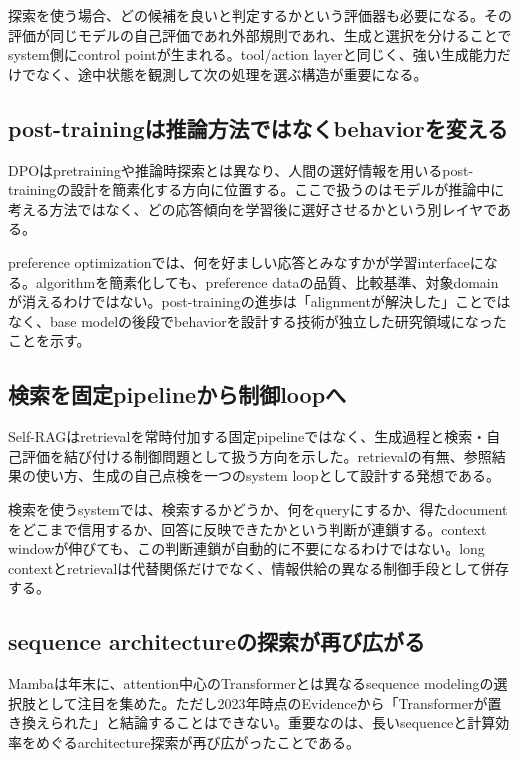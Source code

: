 探索を使う場合、どの候補を良いと判定するかという評価器も必要になる。その評価が同じモデルの自己評価であれ外部規則であれ、生成と選択を分けることでsystem側にcontrol pointが生まれる。tool/action layerと同じく、強い生成能力だけでなく、途中状態を観測して次の処理を選ぶ構造が重要になる。\autocite{src-8a38211129c4}


\subsection{post-trainingは推論方法ではなくbehaviorを変える}

DPOはpretrainingや推論時探索とは異なり、人間の選好情報を用いるpost-trainingの設計を簡素化する方向に位置する。ここで扱うのはモデルが推論中に考える方法ではなく、どの応答傾向を学習後に選好させるかという別レイヤである。\autocite{src-21aef0026892}


preference optimizationでは、何を好ましい応答とみなすかが学習interfaceになる。algorithmを簡素化しても、preference dataの品質、比較基準、対象domainが消えるわけではない。post-trainingの進歩は「alignmentが解決した」ことではなく、base modelの後段でbehaviorを設計する技術が独立した研究領域になったことを示す。\autocite{src-21aef0026892}


\subsection{検索を固定pipelineから制御loopへ}

Self-RAGはretrievalを常時付加する固定pipelineではなく、生成過程と検索・自己評価を結び付ける制御問題として扱う方向を示した。retrievalの有無、参照結果の使い方、生成の自己点検を一つのsystem loopとして設計する発想である。\autocite{src-e413c7ab8da4}


検索を使うsystemでは、検索するかどうか、何をqueryにするか、得たdocumentをどこまで信用するか、回答に反映できたかという判断が連鎖する。context windowが伸びても、この判断連鎖が自動的に不要になるわけではない。long contextとretrievalは代替関係だけでなく、情報供給の異なる制御手段として併存する。\autocite{src-e413c7ab8da4}


\subsection{sequence architectureの探索が再び広がる}

Mambaは年末に、attention中心のTransformerとは異なるsequence modelingの選択肢として注目を集めた。ただし2023年時点のEvidenceから「Transformerが置き換えられた」と結論することはできない。重要なのは、長いsequenceと計算効率をめぐるarchitecture探索が再び広がったことである。\autocite{src-5dd64e15cc75}


